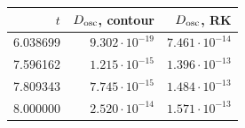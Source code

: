 \begin{tabular}{rrr}
\toprule
$t$ & $D_{\rm osc}$, contour & $D_{\rm osc}$, RK\\
\midrule
6.038699 & $9.302\cdot10^{-19}$ & $7.461\cdot10^{-14}$\\
7.596162 & $1.215\cdot10^{-15}$ & $1.396\cdot10^{-13}$\\
7.809343 & $7.745\cdot10^{-15}$ & $1.484\cdot10^{-13}$\\
8.000000 & $2.520\cdot10^{-14}$ & $1.571\cdot10^{-13}$\\
\bottomrule
\end{tabular}
